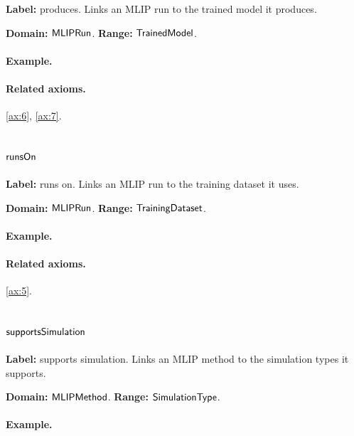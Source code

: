 \textbf{Label:} produces.
Links an MLIP run to the trained model it produces.

\textbf{Domain:} $\mathsf{MLIPRun}$.
\textbf{Range:} $\mathsf{TrainedModel}$.

\paragraph{Example.}

\paragraph{Related axioms.} \eqref{ax:6}, \eqref{ax:7}.

\subsection{$\mathsf{runsOn}$}
\label{sec:term-runsOn}

\textbf{Label:} runs on.
Links an MLIP run to the training dataset it uses.

\textbf{Domain:} $\mathsf{MLIPRun}$.
\textbf{Range:} $\mathsf{TrainingDataset}$.

\paragraph{Example.}

\paragraph{Related axioms.} \eqref{ax:5}.

\subsection{$\mathsf{supportsSimulation}$}
\label{sec:term-supportsSimulation}

\textbf{Label:} supports simulation.
Links an MLIP method to the simulation types it supports.

\textbf{Domain:} $\mathsf{MLIPMethod}$.
\textbf{Range:} $\mathsf{SimulationType}$.

\paragraph{Example.}

